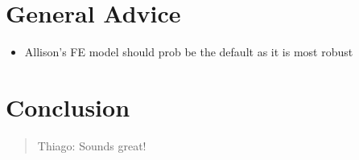 \documentclass[
  letterpaper,
  DIV=11,
  numbers=noendperiod]{scrartcl}
\providecommand{\tightlist}{%
  \setlength{\itemsep}{0pt}\setlength{\parskip}{0pt}}\usepackage{longtable,booktabs,array}
\begin{document}
\section{General Advice}\label{general-advice}

\begin{itemize}
\tightlist
\item
  Allison's FE model should prob be the default as it is most robust
\end{itemize}

\section{Conclusion}\label{conclusion}

\begin{quote}
Thiago: Sounds great!
\end{quote}
\end{document}
